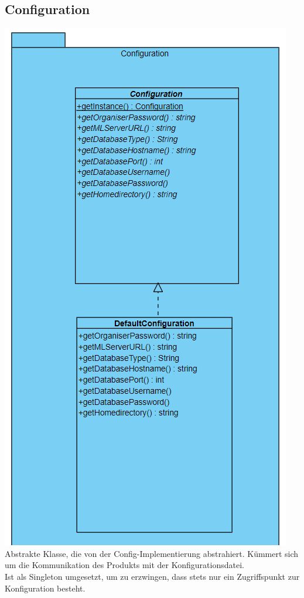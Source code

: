 \documentclass[a4paper]{scrreprt}
\begin{document}
	\subsection{Configuration}
	\includegraphics[width=\textwidth]{img/Configuration.PNG}
	Abstrakte Klasse, die von der Config-Implementierung abstrahiert.
	Kümmert sich um die Kommunikation des Produkts mit der Konfigurationsdatei. \\
	Ist als Singleton umgesetzt, um zu erzwingen, dass stets nur ein Zugriffspunkt zur Konfiguration besteht.
\end{document}

